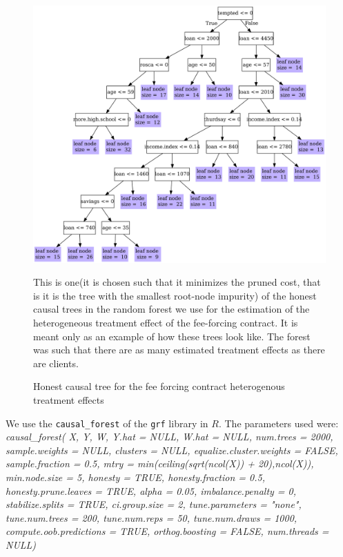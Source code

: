 \documentclass[11pt]{article}
\begin{document}
\vspace{.3in}
\begin{figure}[H]
        \caption{Honest causal tree for the fee forcing contract heterogenous treatment effects}
    \label{casual_tree}
    \begin{center}
        \centering
        \includegraphics[width=.8\textwidth]{Figuras/crf_pro_2_fc_admin_disc.pdf}
    \end{center}
    \footnotesize 
    This is one(it is chosen such that it minimizes the pruned cost, that is it is the tree with the smallest root-node impurity) of the honest causal trees in the random forest we use for the estimation of the heterogeneous treatment effect of the fee-forcing contract. It is meant only as an example of how these trees look like. The forest was such that there are as many estimated treatment effects as there are clients.
\end{figure}

We use \cite{atheygrf} the \texttt{causal\_forest} of the \texttt{grf} library in $R$. The parameters used were:
\scriptsize{\textit{causal\_forest(
  X, 
  Y, 
  W, 
  Y.hat = NULL, 
  W.hat = NULL, 
  num.trees = 2000, 
  sample.weights = NULL, 
  clusters = NULL, 
  equalize.cluster.weights = FALSE, 
  sample.fraction = 0.5, 
  mtry = min(ceiling(sqrt(ncol(X)) + 20),ncol(X)), 
  min.node.size = 5, 
  honesty = TRUE, 
  honesty.fraction = 0.5, 
  honesty.prune.leaves = TRUE, 
  alpha = 0.05, 
  imbalance.penalty = 0, 
  stabilize.splits = TRUE, 
  ci.group.size = 2, 
  tune.parameters = "none", 
  tune.num.trees = 200, 
  tune.num.reps = 50, 
  tune.num.draws = 1000, 
  compute.oob.predictions = TRUE, 
  orthog.boosting = FALSE, 
  num.threads = NULL)}}
\end{document}
